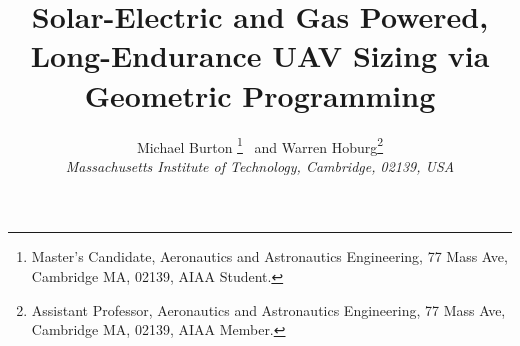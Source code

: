 \usepackage{tikz} %
\title{Solar-Electric and Gas Powered, Long-Endurance UAV Sizing via Geometric Programming}

 \author{
  Michael Burton \thanks{Master's Candidate, Aeronautics and Astronautics Engineering, 77 Mass Ave, Cambridge MA, 02139, AIAA Student.}
  \ and Warren Hoburg\thanks{Assistant Professor, Aeronautics and Astronautics Engineering, 77 Mass Ave, Cambridge MA, 02139, AIAA Member.}\\
  {\normalsize\itshape
   Massachusetts Institute of Technology, Cambridge, 02139, USA}\\
 }


 \newcommand{\eqnref}[1]{(\ref{#1})}
 \newcommand{\class}[1]{\texttt{#1}}
 \newcommand{\package}[1]{\texttt{#1}}
 \newcommand{\file}[1]{\texttt{#1}}
 \newcommand{\BibTeX}{\textsc{Bib}\TeX}
 \usepackage{hyperref}
 \hypersetup{citecolor = blue}
\RequirePackage[normalem]{ulem} %
\RequirePackage{color} %
\providecommand{\DIFaddtex}[1]{{\protect\color{blue}\uwave{#1}}} %
\providecommand{\DIFdeltex}[1]{{\protect\color{red}\sout{#1}}}                      %
\providecommand{\DIFaddbegin}{} %
\providecommand{\DIFaddend}{} %
\providecommand{\DIFdelbegin}{} %
\providecommand{\DIFdelend}{} %
\providecommand{\DIFaddFL}[1]{\DIFadd{#1}} %
\providecommand{\DIFdelFL}[1]{\DIFdel{#1}} %
\providecommand{\DIFaddbeginFL}{} %
\providecommand{\DIFaddendFL}{} %
\providecommand{\DIFdelbeginFL}{} %
\providecommand{\DIFdelendFL}{} %
\providecommand{\DIFadd}[1]{\texorpdfstring{\DIFaddtex{#1}}{#1}} %
\providecommand{\DIFdel}[1]{\texorpdfstring{\DIFdeltex{#1}}{}} %




